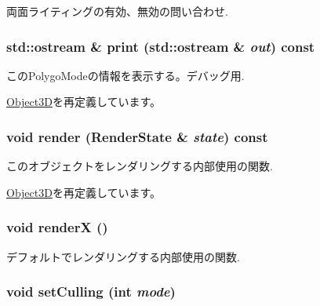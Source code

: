 両面ライティングの有効、無効の問い合わせ. \hypertarget{classm3g_1_1PolygonMode_6fea17fa1532df3794f8cb39cb4f911f}{
\subsubsection[{print}]{\setlength{\rightskip}{0pt plus 5cm}std::ostream \& print (std::ostream \& {\em out}) const}}
\label{classm3g_1_1PolygonMode_6fea17fa1532df3794f8cb39cb4f911f}


このPolygoModeの情報を表示する。デバッグ用. 

\hyperlink{classm3g_1_1Object3D_6fea17fa1532df3794f8cb39cb4f911f}{Object3D}を再定義しています。\hypertarget{classm3g_1_1PolygonMode_8babc8a79b78615da51161e94029eea9}{
\subsubsection[{render}]{\setlength{\rightskip}{0pt plus 5cm}void render ({\bf RenderState} \& {\em state}) const}}
\label{classm3g_1_1PolygonMode_8babc8a79b78615da51161e94029eea9}


このオブジェクトをレンダリングする内部使用の関数. 

\hyperlink{classm3g_1_1Object3D_8babc8a79b78615da51161e94029eea9}{Object3D}を再定義しています。\hypertarget{classm3g_1_1PolygonMode_443a7a301f77f625335ecc06d13bad06}{
\subsubsection[{renderX}]{\setlength{\rightskip}{0pt plus 5cm}void renderX ()}}
\label{classm3g_1_1PolygonMode_443a7a301f77f625335ecc06d13bad06}


デフォルトでレンダリングする内部使用の関数. \hypertarget{classm3g_1_1PolygonMode_55b3fc23392376c00748d68bdf44ca60}{
\subsubsection[{setCulling}]{\setlength{\rightskip}{0pt plus 5cm}void setCulling (int {\em mode})}}
\label{classm3g_1_1PolygonMode_55b3fc23392376c00748d68bdf44ca60}


